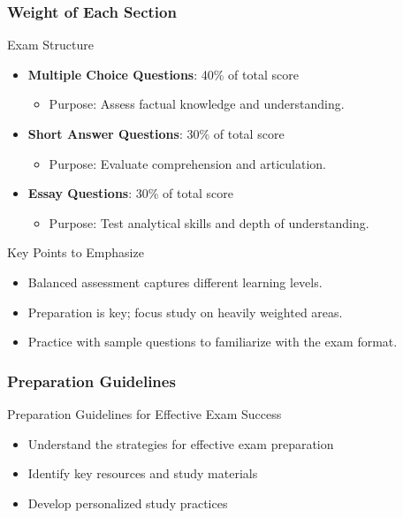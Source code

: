 \documentclass[aspectratio=169]{beamer}
\begin{document}
\begin{frame}[fragile]
    \frametitle{Weight of Each Section}
    \begin{block}{Exam Structure}
        \begin{itemize}
            \item \textbf{Multiple Choice Questions}: 40\% of total score
              \begin{itemize}
                \item Purpose: Assess factual knowledge and understanding.
              \end{itemize}
            \item \textbf{Short Answer Questions}: 30\% of total score
              \begin{itemize}
                \item Purpose: Evaluate comprehension and articulation.
              \end{itemize}
            \item \textbf{Essay Questions}: 30\% of total score 
              \begin{itemize}
                \item Purpose: Test analytical skills and depth of understanding.
              \end{itemize}
        \end{itemize}
    \end{block}
    
    \begin{block}{Key Points to Emphasize}
        \begin{itemize}
            \item Balanced assessment captures different learning levels.
            \item Preparation is key; focus study on heavily weighted areas.
            \item Practice with sample questions to familiarize with the exam format.
        \end{itemize}
    \end{block}
\end{frame}

\begin{frame}[fragile]
    \frametitle{Preparation Guidelines}
    \begin{block}{Preparation Guidelines for Effective Exam Success}
        \begin{itemize}
            \item Understand the strategies for effective exam preparation
            \item Identify key resources and study materials
            \item Develop personalized study practices
        \end{itemize}
    \end{block}
\end{frame}
\end{document}
